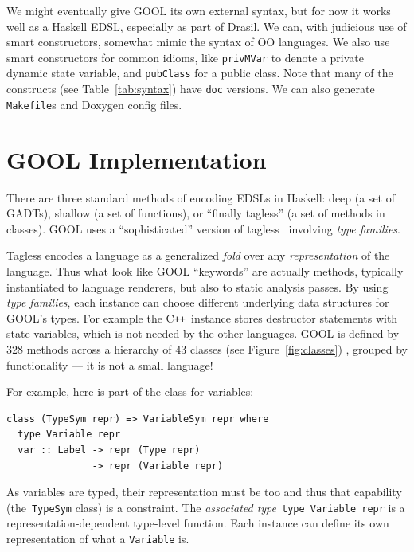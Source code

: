 \documentclass[sigplan,screen,10pt]{acmart}
\newcommand{\Cplusplus}{C\texttt{++}}
\begin{document}
We might eventually give GOOL its own external syntax, but for now it works
well as a Haskell EDSL, especially as part of Drasil. We can, with judicious
use of smart constructors, somewhat mimic the syntax of OO languages.
We also use smart constructors for common idioms, like
\verb|privMVar| to denote a private dynamic state variable, 
and \verb|pubClass| for a public class.  Note that many of the constructs
(see Table~\ref{tab:syntax}) have \verb|doc| versions.  We can also
generate \verb|Makefile|s and Doxygen config files.

\section{GOOL Implementation} \label{sec:implementation}

There are three standard methods of encoding EDSLs in Haskell:
deep (a set of GADTs), shallow (a set of functions), or ``finally
tagless'' (a set of methods in classes).  GOOL uses a
``sophisticated'' version of tagless~\cite{carette2009finally}
involving \emph{type families}. 

Tagless encodes a language as a generalized
\emph{fold} over any \emph{representation} of the language.  Thus what
look like GOOL ``keywords'' are actually methods, typically 
instantiated to language renderers, but also to static
analysis passes. By using \emph{type families}, each instance can choose
different underlying data structures for GOOL's types.  For example the
\Cplusplus~instance stores destructor statements with state variables, which
is not needed by the other languages.  GOOL is defined by 
$328$ methods across a hierarchy of $43$ classes (see Figure~\ref{fig:classes})
, grouped by functionality --- it is not a small language!

For example, here is part of the class for variables:
\begin{lstlisting}
class (TypeSym repr) => VariableSym repr where
  type Variable repr
  var :: Label -> repr (Type repr)
               -> repr (Variable repr)
\end{lstlisting}
As variables are typed, their representation must be too and
thus that capability (the~\verb|TypeSym| class) is a constraint.  
The \emph{associated type}~\verb|type Variable repr| is a representation-dependent
type-level function.  Each instance can define its own representation of what a
\verb|Variable| is. 
\end{document}
